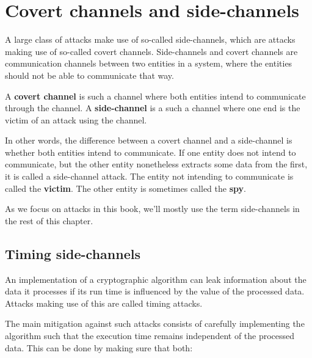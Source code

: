 \documentclass[a4paper,]{report}
\begin{document}
\hypertarget{covert-channels-and-side-channels}{%
\chapter{Covert channels and
side-channels}\label{covert-channels-and-side-channels}}

A large class of attacks make use of so-called side-channels, which are
attacks making use of so-called covert channels. Side-channels and
covert channels are communication channels between two entities in a
system, where the entities should not be able to communicate that way.

A \textbf{covert channel} is such a channel where
both entities intend to communicate through the channel. A
\textbf{side-channel} is a such a channel where one
end is the victim of an attack using the channel.

In other words, the difference between a covert channel and a
side-channel is whether both entities intend to communicate. If one
entity does not intend to communicate, but the other entity nonetheless
extracts some data from the first, it is called a side-channel attack.
The entity not intending to communicate is called the
\textbf{victim}. The other entity is sometimes called the
\textbf{spy}.

As we focus on attacks in this book, we'll mostly use the term
side-channels in the rest of this chapter.

\hypertarget{timing-side-channels}{%
\section{Timing side-channels}\label{timing-side-channels}}

An implementation of a cryptographic algorithm can leak information
about the data it processes if its run time is influenced by the value
of the processed data. Attacks making use of this are called timing
attacks.

The main mitigation against such attacks consists of carefully
implementing the algorithm such that the execution time remains
independent of the processed data. This can be done by making sure that
both:
\end{document}
